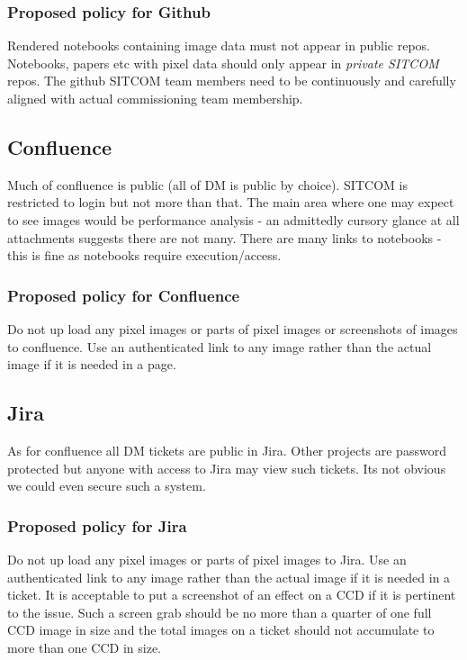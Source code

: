 \subsubsection{Proposed policy for Github}
Rendered notebooks containing image data must not appear in public repos.
Notebooks, papers etc with pixel data should only appear in \emph{private SITCOM} repos.
The github SITCOM team members need to be continuously and carefully aligned with actual commissioning team membership.

\subsection{Confluence}
Much of confluence is public (all of DM is public by choice).
SITCOM is restricted to login but not more than that.
The main area where one may expect to see images would be performance analysis - an admittedly  cursory glance at all attachments suggests there are not many.
There are many links to notebooks - this is fine as notebooks require execution/access.

\subsubsection{Proposed policy for Confluence}
Do not up load any pixel images or parts of pixel images or screenshots of images to confluence.
Use an authenticated link to any image rather than the actual image if it is needed in a page.


\subsection{Jira}
As for confluence all DM tickets are public in Jira.
Other projects are password protected but anyone with access to Jira may view such tickets.
Its not obvious we could even secure such a system.

\subsubsection{Proposed policy for Jira}
Do not up load any pixel images or parts of pixel images to Jira.
Use an authenticated link to any image rather than the actual image if it is needed in a ticket.
It is acceptable to put a screenshot of an effect on a CCD if it is pertinent to the issue.
Such a screen grab should be no more than a quarter of  one full CCD image in size and the total images on a ticket should not accumulate to more than one CCD in size.

